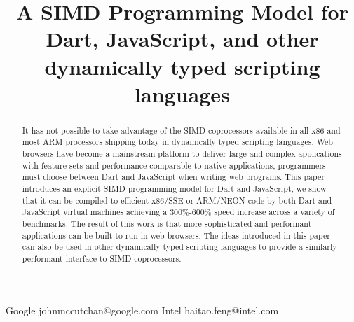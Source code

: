 \documentclass[preprint]{sigplanconf}
\begin{document}
\setlength{\pdfpageheight}{\paperheight}
\setlength{\pdfpagewidth}{\paperwidth}






\title{A SIMD Programming Model for Dart, JavaScript, and other dynamically typed scripting languages}

           {Google}
           {johnmccutchan@google.com}
           {Intel}
           {haitao.feng@intel.com}

\maketitle

\begin{abstract}
It has not possible to take advantage of the SIMD coprocessors available in all x86 and most ARM processors shipping today in dynamically typed scripting languages. Web browsers have become a mainstream platform to deliver large and complex applications with feature sets and performance comparable to native applications, programmers must choose between Dart and JavaScript when writing web programs. This paper introduces an explicit SIMD programming model for Dart and JavaScript, we show that it can be compiled to efficient x86/SSE or ARM/NEON code by both Dart and JavaScript virtual machines achieving a 300\%-600\% speed increase across a variety of benchmarks. The result of this work is that more sophisticated and performant applications can be built to run in web browsers. The ideas introduced in this paper can also be used in other dynamically typed scripting languages to provide a similarly performant interface to SIMD coprocessors.
\end{abstract}
\end{document}
